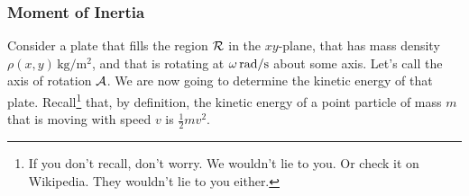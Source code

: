 \begin{eg}
\end{eg}

\subsubsection{Moment of Inertia}
Consider a plate that fills the region $\mathcal{R}$ in the $xy$-plane,
that has mass density $\rho(x,y)\,\text{kg}/\text{m}^2$, and that is
rotating at $\omega\,\text{rad}/\text{s}$  about some axis.
Let's call the axis of rotation $\mathcal{A}$.
We are now going to determine the kinetic energy of that plate. 
Recall\footnote{If you don't recall, don't worry. We wouldn't lie to you.
Or check it on Wikipedia. They wouldn't lie to you either.
} 
that, by definition, the kinetic energy of a point particle of
mass $m$ that is moving with speed $v$ is $\frac{1}{2}mv^2$.

